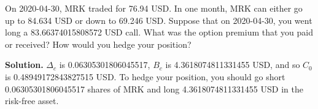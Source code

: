 \noindent On 2020-04-30, MRK traded for 76.94 USD. In one month, MRK can either go up to 84.634 USD or down to 69.246 USD. Suppose that on 2020-04-30, you went long a 83.66374015808572 USD call. What was the option premium that you paid or received? How would you hedge your position?

\vspace{9pt}

\noindent\textbf{Solution.} $\Delta_{c}$ is 0.06305301806045517, $B_{c}$ is 4.3618074811331455 USD, and so $C_{0}$ is 0.48949172843827515 USD. To hedge your position, you should go short 0.06305301806045517 shares of MRK and long 4.3618074811331455 USD in the risk-free asset.